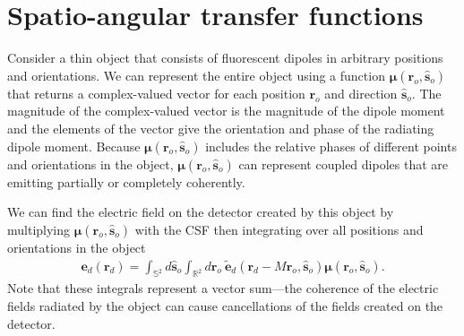 \documentclass[11pt]{article}
\providecommand{\mb}[1]{\mathbf{#1}}
\providecommand{\ro}[1]{\mathbf{\mathbf{r}}_o}
\providecommand{\so}[1]{\mathbf{\hat{s}}_o}
\providecommand{\rd}[1]{\mathbf{r}_d}
\providecommand{\bs}[1]{\boldsymbol{#1}}
\begin{document}
\section{Spatio-angular transfer functions}
Consider a thin object that consists of fluorescent dipoles in arbitrary
positions and orientations. We can represent the entire object using a function
$\bs{\mu}(\ro{}, \so{})$ that returns a complex-valued vector for each position
$\ro{}$ and direction $\so{}$. The magnitude of the complex-valued vector is the
magnitude of the dipole moment and the elements of the vector give the orientation
and phase of the radiating dipole moment. Because $\bs{\mu}(\ro{}, \so{})$
includes the relative phases of different points and orientations in the object,
$\bs{\mu}(\ro{}, \so{})$ can represent coupled dipoles that are emitting
partially or completely coherently.

We can find the electric field on the detector created by this object by
multiplying $\bs{\mu}(\ro{}, \so{})$ with the CSF then integrating over all
positions and orientations in the object
\begin{align}
  \mb{e}_d(\rd{}) = \int_{\mathbb{S}^2}d\so{}\int_{\mathbb{R}^2}d\ro{} \ \tilde{\mb{e}}_d(\rd{} - M\mb{r}_o, \so{})\bs{\mu}(\ro{}, \so{}).\label{eq:eforward}
\end{align}
Note that these integrals represent a vector sum---the coherence of the electric
fields radiated by the object can cause cancellations of the fields created on
the detector.
\end{document}
